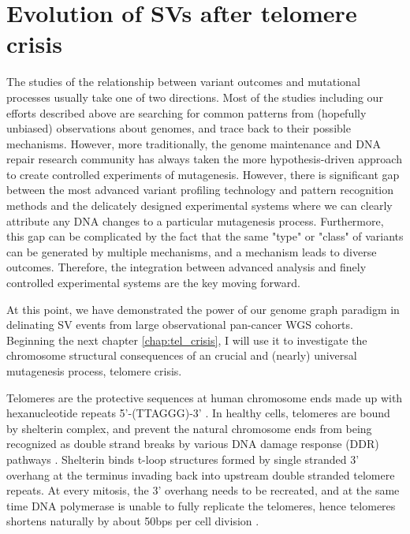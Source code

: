 \documentclass[phd,tocprelim]{cornell}
\begin{document}
\section{Evolution of SVs after telomere crisis}
The studies of the relationship between variant outcomes and mutational processes usually take one of two directions. Most of the studies including our efforts described above are searching for common patterns from (hopefully unbiased) observations about genomes, and trace back to their possible mechanisms. However, more traditionally, the genome maintenance and DNA repair research community has always taken the more hypothesis-driven approach to create controlled experiments of mutagenesis. However, there is significant gap between the most advanced variant profiling technology and pattern recognition methods and the delicately designed experimental systems where we can clearly attribute any DNA changes to a particular mutagenesis process. Furthermore, this gap can be complicated by the fact that the same "type" or "class" of variants can be generated by multiple mechanisms, and a mechanism leads to diverse outcomes. Therefore, the integration between advanced analysis and finely controlled experimental systems are the key moving forward.

At this point, we have demonstrated the power of our genome graph paradigm in delinating SV events from large observational pan-cancer WGS cohorts. Beginning the next chapter \ref{chap:tel_crisis}, I will use it to investigate the chromosome structural consequences of an crucial and (nearly) universal mutagenesis process, telomere crisis.

Telomeres are the protective sequences at human chromosome ends made up with hexanucleotide repeats 5'-(TTAGGG)-3' \cite{De_Lange1990-mz}. In healthy cells, telomeres are bound by shelterin complex, and prevent the natural chromosome ends from being recognized as double strand breaks by various DNA damage response (DDR) pathways \cite{De_Lange2005-cn}. Shelterin binds t-loop structures formed by single stranded 3' overhang at the terminus invading back into upstream double stranded telomere repeats. At every mitosis, the 3' overhang needs to be recreated, and at the same time DNA polymerase is unable to fully replicate the telomeres, hence telomeres shortens naturally by about 50bps per cell division \cite{De_Lange2005-cn}. 
\end{document}
